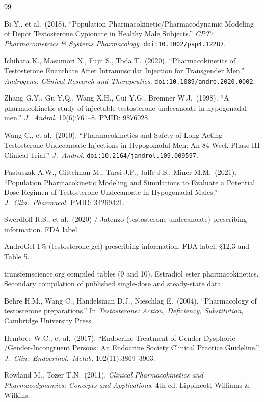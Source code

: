 \documentclass[11pt,a4paper]{article}
\begin{document}
\begin{thebibliography}{99}

Bi Y., et al.\ (2018). ``Population Pharmacokinetic/Pharmacodynamic
Modeling of Depot Testosterone Cypionate in Healthy Male Subjects.''
\emph{CPT: Pharmacometrics \& Systems Pharmacology}.
\texttt{doi:10.1002/psp4.12287}.

Ichihara K., Masumori N., Fujii S., Toda T.\ (2020). ``Pharmacokinetics
of Testosterone Enanthate After Intramuscular Injection for Transgender
Men.'' \emph{Androgens: Clinical Research and Therapeutics}.
\texttt{doi:10.1089/andro.2020.0002}.

Zhang G.Y., Gu Y.Q., Wang X.H., Cui Y.G., Bremner W.J.\ (1998). ``A
pharmacokinetic study of injectable testosterone undecanoate in
hypogonadal men.'' \emph{J.\ Androl.} 19(6):761--8.
PMID: 9876028.

Wang C., et al.\ (2010). ``Pharmacokinetics and Safety of Long-Acting
Testosterone Undecanoate Injections in Hypogonadal Men: An 84-Week
Phase III Clinical Trial.'' \emph{J.\ Androl.}
\texttt{doi:10.2164/jandrol.109.009597}.

Pastuszak A.W., Gittelman M., Tursi J.P., Jaffe J.S., Miner M.M.\
(2021). ``Population Pharmacokinetic Modeling and Simulations to
Evaluate a Potential Dose Regimen of Testosterone Undecanoate in
Hypogonadal Males.'' \emph{J.\ Clin.\ Pharmacol.}
PMID: 34269421.

Swerdloff R.S., et al.\ (2020) / Jatenzo (testosterone undecanoate)
prescribing information. FDA label.

AndroGel 1\% (testosterone gel) prescribing information. FDA label,
\S12.3 and Table 5.

transfemscience.org compiled tables (9 and 10). Estradiol ester
pharmacokinetics. Secondary compilation of published single-dose and
steady-state data.

Behre H.M., Wang C., Handelsman D.J., Nieschlag E.\ (2004).
``Pharmacology of testosterone preparations.'' In \emph{Testosterone:
Action, Deficiency, Substitution}, Cambridge University Press.

Hembree W.C., et al.\ (2017). ``Endocrine Treatment of Gender-Dysphoric
/Gender-Incongruent Persons: An Endocrine Society Clinical Practice
Guideline.'' \emph{J.\ Clin.\ Endocrinol.\ Metab.} 102(11):3869--3903.

Rowland M., Tozer T.N.\ (2011). \emph{Clinical Pharmacokinetics and
Pharmacodynamics: Concepts and Applications}. 4th ed. Lippincott
Williams \& Wilkins.

\end{thebibliography}
\end{document}
